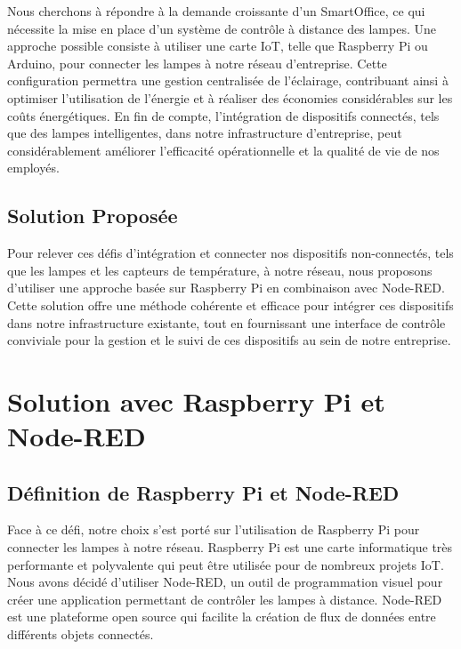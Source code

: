 Nous cherchons à répondre à la demande croissante d'un SmartOffice, ce qui nécessite la mise en place d'un système de contrôle à distance des lampes. Une approche possible consiste à utiliser une carte IoT, telle que Raspberry Pi ou Arduino, pour connecter les lampes à notre réseau d'entreprise. Cette configuration permettra une gestion centralisée de l'éclairage, contribuant ainsi à optimiser l'utilisation de l'énergie et à réaliser des économies considérables sur les coûts énergétiques. En fin de compte, l'intégration de dispositifs connectés, tels que des lampes intelligentes, dans notre infrastructure d'entreprise, peut considérablement améliorer l'efficacité opérationnelle et la qualité de vie de nos employés.

\subsection{Solution Proposée}

Pour relever ces défis d'intégration et connecter nos dispositifs non-connectés, tels que les lampes et les capteurs de température, à notre réseau, nous proposons d'utiliser une approche basée sur Raspberry Pi en combinaison avec Node-RED. Cette solution offre une méthode cohérente et efficace pour intégrer ces dispositifs dans notre infrastructure existante, tout en fournissant une interface de contrôle conviviale pour la gestion et le suivi de ces dispositifs au sein de notre entreprise.




\section{Solution avec Raspberry Pi et Node-RED}


\subsection{Définition de Raspberry Pi et Node-RED}

Face à ce défi, notre choix s'est porté sur l'utilisation de Raspberry Pi pour connecter les lampes à notre réseau. Raspberry Pi est une carte informatique très performante et polyvalente qui peut être utilisée pour de nombreux projets IoT. \cite{richardson2012getting} \\

Nous avons décidé d'utiliser Node-RED, un outil de programmation visuel pour créer une application permettant de contrôler les lampes à distance. Node-RED est une plateforme open source qui facilite la création de flux de données entre différents objets connectés. \cite{lekic2018iot} \\

